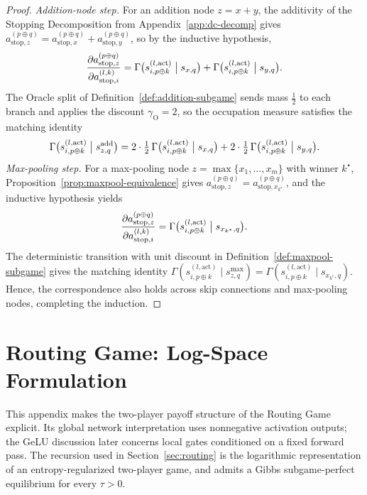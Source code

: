 \documentclass[twoside]{article}
\newcommand{\1}{\mathbf{1}}
\begin{document}
\begin{proof}
\emph{Addition-node step.} For an addition node $z = x + y$, the additivity of the Stopping
Decomposition from Appendix~\ref{app:dc-decomp} gives $a_{\mathrm{stop},z}^{(p \oplus q)} =
    a_{\mathrm{stop},x}^{(p \oplus q)} + a_{\mathrm{stop},y}^{(p \oplus q)}$, so by the inductive
hypothesis,
\begin{align}
    \frac{\partial a_{\mathrm{stop},z}^{(p \oplus q)}}{\partial a_{\mathrm{stop},i}^{(l, k)}}
    = \Gamma\bigl(s_{i, p \oplus k}^{(l, \mathrm{act})} \bigm| s_{x,q}\bigr) + \Gamma\bigl(s_{i, p
    \oplus k}^{(l, \mathrm{act})} \bigm| s_{y,q}\bigr).
\end{align}
The Oracle split of Definition~\ref{def:addition-subgame} sends mass $\tfrac12$ to each branch and
applies the discount $\gamma_{\mathrm{O}} = 2$, so the occupation measure satisfies the matching
identity
\begin{align}
    \Gamma\bigl(s_{i, p \oplus k}^{(l, \mathrm{act})} \bigm| s_{z,q}^{\mathrm{add}}\bigr)
    = 2 \cdot \tfrac{1}{2}\, \Gamma\bigl(s_{i, p \oplus k}^{(l, \mathrm{act})} \bigm| s_{x,q}\bigr)
    + 2 \cdot \tfrac{1}{2}\, \Gamma\bigl(s_{i, p \oplus k}^{(l, \mathrm{act})} \bigm| s_{y,q}\bigr).
\end{align}
\emph{Max-pooling step.} For a max-pooling node $z = \max\{x_1, \dots, x_m\}$ with winner
$k^\star$, Proposition~\ref{prop:maxpool-equivalence} gives $a_{\mathrm{stop},z}^{(p \oplus q)} =
    a_{\mathrm{stop},x_{k^\star}}^{(p \oplus q)}$, and the inductive hypothesis yields
\begin{align}
    \frac{\partial a_{\mathrm{stop},z}^{(p \oplus q)}}{\partial a_{\mathrm{stop},i}^{(l, k)}}
    = \Gamma\bigl(s_{i, p \oplus k}^{(l, \mathrm{act})} \bigm| s_{x_{k^\star},q}\bigr).
\end{align}
The deterministic transition with unit discount in Definition~\ref{def:maxpool-subgame} gives the
matching identity $\Gamma(s_{i, p \oplus k}^{(l, \mathrm{act})} \mid s_{z,q}^{\max}) = \Gamma(s_{i,
    p \oplus k}^{(l, \mathrm{act})} \mid s_{x_{k^\star},q})$. Hence, the correspondence also holds
across skip connections and max-pooling nodes, completing the induction.
\end{proof}
\newpage
\section{Routing Game: Log-Space Formulation}\label{app:routing-formal}

This appendix makes the two-player payoff structure of the Routing Game explicit. Its global network interpretation uses nonnegative activation outputs; the GeLU discussion later concerns local gates conditioned on a fixed forward pass. The recursion
used in Section~\ref{sec:routing} is the logarithmic representation of an entropy-regularized
two-player game, and admits a Gibbs subgame-perfect equilibrium for every $\tau>0$.
\end{document}
